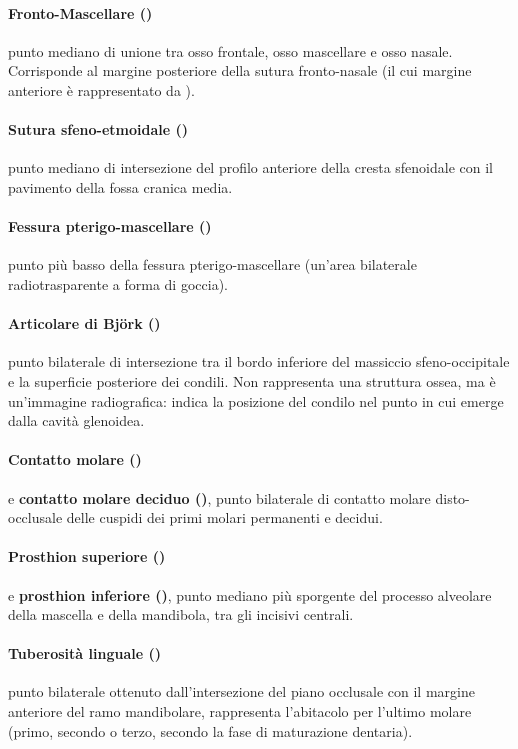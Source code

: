 \paragraph{Fronto-Mascellare ()} punto mediano di unione tra osso frontale, osso mascellare e osso nasale. Corrisponde al margine posteriore della sutura fronto-nasale (il cui margine anteriore è rappresentato da ).
\paragraph{Sutura sfeno-etmoidale ()} punto mediano di intersezione del profilo anteriore della cresta sfenoidale con il pavimento della fossa cranica media.
\paragraph{Fessura pterigo-mascellare ()} punto più basso della fessura pterigo-ma\-scel\-la\-re (un'area bilaterale radiotrasparente a forma di goccia).
\paragraph{Articolare di Björk ()} punto bilaterale di intersezione tra il bordo inferiore del massiccio sfeno-occipitale e la superficie posteriore dei condili. Non rappresenta una struttura ossea, ma è un'immagine radiografica: indica la posizione del condilo nel punto in cui emerge dalla cavità glenoidea.
\paragraph{Contatto molare ()} e \textbf{contatto molare deciduo ()}, punto bilaterale di contatto molare disto-occlusale delle cuspidi dei primi molari permanenti e decidui.
\paragraph{Prosthion superiore ()} e \textbf{prosthion inferiore ()}, punto mediano più sporgente del processo alveolare della mascella e della mandibola, tra gli incisivi centrali.
\paragraph{Tuberosità linguale ()} punto bilaterale ottenuto dall'intersezione del piano occlusale con il margine anteriore del ramo mandibolare, rappresenta l'abitacolo per l'ultimo molare (primo, secondo o terzo, secondo la fase di maturazione dentaria).

